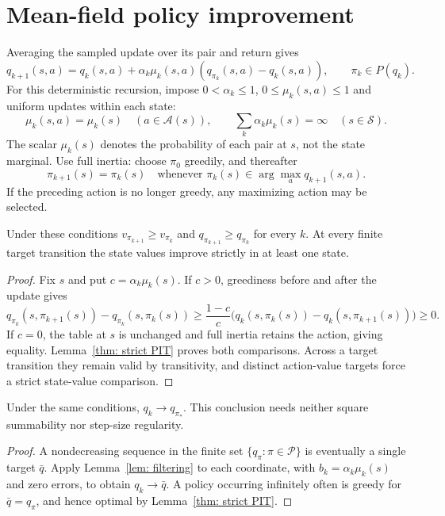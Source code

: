 \section{Mean-field policy improvement}
\label{sec: mean field}
Averaging the sampled update over its pair and return gives
\begin{equation}\label{eq: deterministic mcopi}
q_{k+1}(s,a)=q_k(s,a)+\alpha_k\mu_k(s,a)(q_{\pi_k}(s,a)-q_k(s,a)),\qquad\pi_k\in P(q_k).
\end{equation}
For this deterministic recursion, impose $0<\alpha_k\le1$, $0\le\mu_k(s,a)\le1$ and uniform updates within each state:
\begin{equation}\label{asp: unbiased over policies}
\mu_k(s,a)=\mu_k(s)\quad(a\in\mathcal A(s)),\qquad
\sum_k\alpha_k\mu_k(s)=\infty\quad(s\in\mathcal S).
\end{equation}
The scalar $\mu_k(s)$ denotes the probability of each pair at $s$, not the state marginal. Use full inertia: choose $\pi_0$ greedily, and thereafter
\begin{equation}\label{eq:greedy-pol-tie-breaking}
\pi_{k+1}(s)=\pi_k(s)\quad\text{whenever }\pi_k(s)\in\arg\max_a q_{k+1}(s,a).
\end{equation}
If the preceding action is no longer greedy, any maximizing action may be selected.

\begin{proposition}\label{thm: improving policies}
Under these conditions $v_{\pi_{k+1}}\ge v_{\pi_k}$ and $q_{\pi_{k+1}}\ge q_{\pi_k}$ for every $k$. At every finite target transition the state values improve strictly in at least one state.
\end{proposition}
\begin{proof}
Fix $s$ and put $c=\alpha_k\mu_k(s)$. If $c>0$, greediness before and after the update gives
\[
q_{\pi_k}(s,\pi_{k+1}(s))-q_{\pi_k}(s,\pi_k(s))
\ge\frac{1-c}{c}\bigl(q_k(s,\pi_k(s))-q_k(s,\pi_{k+1}(s))\bigr)\ge0.
\]
If $c=0$, the table at $s$ is unchanged and full inertia retains the action, giving equality. Lemma~\ref{thm: strict PIT} proves both comparisons. Across a target transition they remain valid by transitivity, and distinct action-value targets force a strict state-value comparison.
\end{proof}

\begin{proposition}\label{thm: convergence deterministic mcopi}
Under the same conditions, $q_k\to q_{\pi_*}$. This conclusion needs neither square summability nor step-size regularity.
\end{proposition}
\begin{proof}
A nondecreasing sequence in the finite set $\{q_\pi:\pi\in\mathcal P\}$ is eventually a single target $\bar q$. Apply Lemma~\ref{lem: filtering} to each coordinate, with $b_k=\alpha_k\mu_k(s)$ and zero errors, to obtain $q_k\to\bar q$. A policy occurring infinitely often is greedy for $\bar q=q_\pi$, and hence optimal by Lemma~\ref{thm: strict PIT}.
\end{proof}

